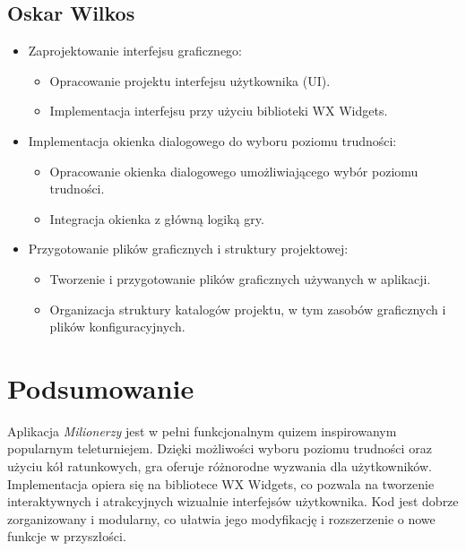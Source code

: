\documentclass[]{article}
\begin{document}
\subsection{Oskar Wilkos}
\begin{itemize}
	\item Zaprojektowanie interfejsu graficznego:
	\begin{itemize}
		\item Opracowanie projektu interfejsu użytkownika (UI).
		\item Implementacja interfejsu przy użyciu biblioteki WX Widgets.
	\end{itemize}
	\item Implementacja okienka dialogowego do wyboru poziomu trudności:
	\begin{itemize}
		\item Opracowanie okienka dialogowego umożliwiającego wybór poziomu trudności.
		\item Integracja okienka z główną logiką gry.
	\end{itemize}
	\item Przygotowanie plików graficznych i struktury projektowej:
	\begin{itemize}
		\item Tworzenie i przygotowanie plików graficznych używanych w aplikacji.
		\item Organizacja struktury katalogów projektu, w tym zasobów graficznych i plików konfiguracyjnych.
	\end{itemize}
\end{itemize}

\section{Podsumowanie}
Aplikacja \emph{Milionerzy} jest w pełni funkcjonalnym quizem inspirowanym popularnym teleturniejem. Dzięki możliwości wyboru poziomu trudności oraz użyciu kół ratunkowych, gra oferuje różnorodne wyzwania dla użytkowników. Implementacja opiera się na bibliotece WX Widgets, co pozwala na tworzenie interaktywnych i atrakcyjnych wizualnie interfejsów użytkownika. Kod jest dobrze zorganizowany i modularny, co ułatwia jego modyfikację i rozszerzenie o nowe funkcje w przyszłości.
\end{document}
